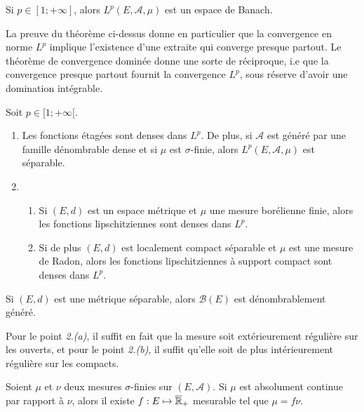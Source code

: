 \documentclass[11pt,a4paper]{article}
\begin{document}
\begin{thm}
Si $p \in [1; +\infty]$, alors $L^p(E,\mathcal{A},\mu)$ est un espace de Banach.
\end{thm}


\begin{rmq}
La preuve du théorème ci-dessus donne en particulier que la convergence en norme $L^p$ implique l'existence d'une extraite qui converge presque partout. Le théorème de convergence dominée donne une sorte de réciproque, i.e que la convergence presque partout fournit la convergence $L^p$, sous réserve d'avoir une domination intégrable.
\end{rmq}

\begin{thm}[Densité]
Soit $p \in [1;+\infty[$.
\begin{enumerate}
\item Les fonctions étagées sont denses dans $L^p$. De plus, si $\mathcal{A}$ est généré par une famille dénombrable dense et si $\mu$ est $\sigma$-finie, alors $L^p(E,\mathcal{A}, \mu)$ est séparable.
\item 
\begin{enumerate}
\item Si $(E,d)$ est un espace métrique et $\mu$ une mesure borélienne finie, alors les fonctions lipschitziennes sont denses dans $L^p$.
\item Si de plus $(E,d)$ est localement compact séparable et $\mu$ est une mesure de Radon, alors les fonctions lipschitziennes à support compact sont denses dans $L^p$.
\end{enumerate}
\end{enumerate}
\end{thm}

\begin{rmq}
Si  $(E,d)$ est une métrique séparable, alors $\mathcal{B}(E)$ est dénombrablement généré.
\end{rmq}

\begin{rmq}
Pour le point \textit{2.(a)}, il suffit en fait que la mesure soit extérieurement régulière sur les ouverts, et pour le point \textit{2.(b)}, il suffit qu'elle soit de plus intérieurement régulière sur les compacts.
\end{rmq}


\begin{thm}
Soient $\mu$ et $\nu$ deux mesures $\sigma$-finies sur $(E,\mathcal{A})$. Si $\mu$ est absolument continue par rapport à $\nu$, alors il existe $f : E \mapsto \overline{\mathbb R}_+$ mesurable tel que $\mu=f\nu$.
\end{thm}
\end{document}
